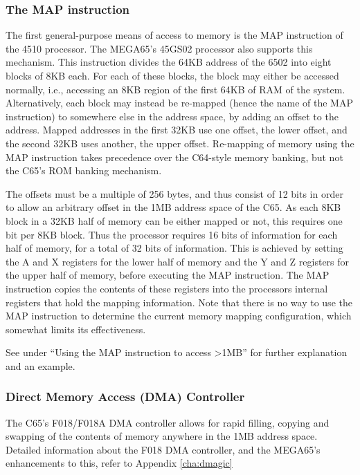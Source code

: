 \subsubsection{The MAP instruction}
\label{sec:map-instruction}

The first general-purpose means of access to memory is the MAP instruction of the
4510 processor. The MEGA65's 45GS02 processor also supports this mechanism.
This instruction divides the 64KB address of the 6502 into eight blocks of 8KB each.
For each of these blocks, the block may either be accessed normally, i.e., accessing
an 8KB region of the first 64KB of RAM of the system.  Alternatively, each block
may instead be re-mapped (hence the name of the MAP instruction) to somewhere else
in the address space, by adding an offset to the address. Mapped addresses in the
first 32KB use one offset, the lower offset, and the second 32KB uses another, the
upper offset.  Re-mapping of memory using the MAP instruction takes precedence over
the C64-style memory banking, but not the C65's ROM banking mechanism.

The offsets must be a multiple of 256 bytes, and thus consist of 12 bits
in order to allow an arbitrary offset in the 1MB address space of the C65.  As each 8KB
block in a 32KB half of memory can be either mapped or not, this requires one bit per
8KB block.  Thus the processor requires 16 bits of information for each half of memory, for
a total of 32 bits of information.  This is achieved by setting the A and X registers for
the lower half of memory and the Y and Z registers for the upper half of memory, before executing
the MAP instruction.  The MAP instruction copies the contents of these registers into the
processors internal registers that hold the mapping information.  Note that there is no way to
use the MAP instruction to determine the current memory mapping configuration, which somewhat
limits its effectiveness.

See under ``Using the MAP instruction to access >1MB'' for further explanation and an example.

\subsubsection{Direct Memory Access (DMA) Controller}

The C65's F018/F018A DMA controller allows for rapid filling, copying and swapping of the contents of memory
anywhere in the 1MB address space. Detailed information about the F018 DMA controller, and the MEGA65's
enhancements to this, refer to Appendix \ref{cha:dmagic}


